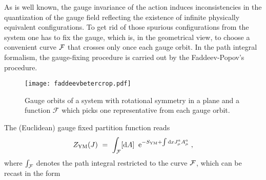 As is well known, the gauge invariance of the action induces inconsistencies in the
quantization of the gauge field reflecting the existence of infinite physically equivalent
configurations. To get rid of those spurious configurations from the system one has to fix the
gauge, which is, in the geometrical view, to choose a convenient curve ${\cal F}$ that crosses
only once each gauge orbit. In the path integral formalism, the gauge-fixing procedure is
carried out by the Faddeev-Popov's procedure.


\begin{figure}[h]
\begin{center}
\texttt{[image: faddeevbetercrop.pdf]}
\caption{Gauge orbits of a system with rotational symmetry in a plane and a function $\mathcal F$ which picks one representative from each gauge orbit.}
\label{fig1}
\end{center}
\end{figure}


The (Euclidean) gauge fixed partition function reads
\begin{eqnarray}
\label{genym}
Z_{\text{YM}}(J) ~=~ \int_{\cal F} [\mathrm{d} A]\;\; \mathrm{e}^{-S_{\text{YM}} + \int {\rm d} x J_\mu^a A_\mu^a}\;,
\label{YMaction0}
\end{eqnarray}
where $\int_{\cal F}$ denotes the path integral restricted to the curve $\cal F$, which can be recast in the form



